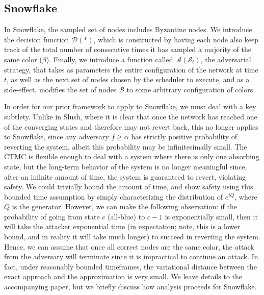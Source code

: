 \documentclass[letterpaper,twocolumn,10pt]{article}
\theoremstyle{definition}
\begin{document}
\begin{appendices}
\subsection{Snowflake}
\label{subsection:appendix_snowflake}
In Snowflake, the sampled set of nodes includes Byzantine nodes.
We introduce the decision function $\mathcal{D}(*)$, which is constructed by having each node also keep track of the total number of consecutive times it has sampled a majority of the same color ($\beta$). 
Finally, we introduce a function called $\mathcal{A}(\mathcal{S}_t)$, the adversarial strategy, that takes as parameters the entire configuration of the network at time $t$, as well as the next set of nodes chosen by the scheduler to execute, and as a side-effect, modifies the set of nodes $\mathcal{B}$ to some arbitrary configuration of colors.

In order for our prior framework to apply to Snowflake, we must deal with a key subtlety. 
Unlike in Slush, where it is clear that once the network has reached one of the converging states and therefore may not revert back, this no longer applies to Snowflake, since any adversary $f \geq \alpha$ has strictly positive probability of reverting the system, albeit this probability may be infinitesimally small. 
The CTMC is flexible enough to deal with a system where there is only one absorbing state, but the long-term behavior of the system is no longer meaningful since, after an infinite amount of time, the system is guaranteed to revert, violating safety. 
We could trivially bound the amount of time, and show safety using this bounded time assumption by simply characterizing the distribution of $e^{tQ}$, where $Q$ is the generator. 
However, we can make the following observation: if the probability of going from state $c$ (all-blue) to $c-1$ is exponentially small, then it will take the attacker exponential time (in expectation; note, this is a lower bound, and in reality it will take much longer) to succeed in reverting the system. 
Hence, we can assume that once all correct nodes are the same color, the attack from the adversary will terminate since it is impractical to continue an attack. 
In fact, under reasonably bounded timeframes, the variational distance between the exact approach and the approximation is very small. 
We leave details to the accompanying paper, but we briefly discuss how analysis proceeds for Snowflake. 


\end{appendices}
\end{document}
